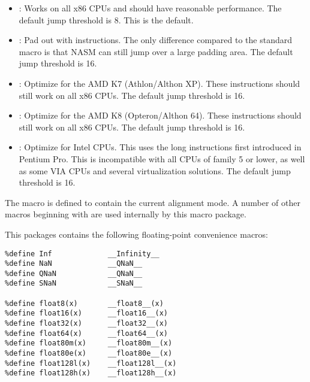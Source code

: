 \begin{itemize}
    \item{: Works on all x86 CPUs and should have
        reasonable performance. The default jump threshold is 8.
        This is the default.}

    \item{: Pad out with  instructions. The only
        difference compared to the standard  macro is that NASM
        can still jump over a large padding area. The default jump
        threshold is 16.}

    \item{: Optimize for the AMD K7 (Athlon/Althon XP).
        These instructions should still work on all x86 CPUs. The default
        jump threshold is 16.}

    \item{: Optimize for the AMD K8 (Opteron/Althon 64).
        These instructions should still work on all x86 CPUs. The default
        jump threshold is 16.}

    \item{: Optimize for Intel CPUs. This uses the long
         instructions first introduced in Pentium Pro. This
        is incompatible with all CPUs of family 5 or lower, as well as
        some VIA CPUs and several virtualization solutions. The default
        jump threshold is 16.}
\end{itemize}

The macro  is defined to contain the
current alignment mode. A number of other macros beginning with
 are used internally by this macro package.


This packages contains the following floating-point convenience macros:

\begin{lstlisting}
%define Inf             __Infinity__
%define NaN             __QNaN__
%define QNaN            __QNaN__
%define SNaN            __SNaN__

%define float8(x)       __float8__(x)
%define float16(x)      __float16__(x)
%define float32(x)      __float32__(x)
%define float64(x)      __float64__(x)
%define float80m(x)     __float80m__(x)
%define float80e(x)     __float80e__(x)
%define float128l(x)    __float128l__(x)
%define float128h(x)    __float128h__(x)
\end{lstlisting}

